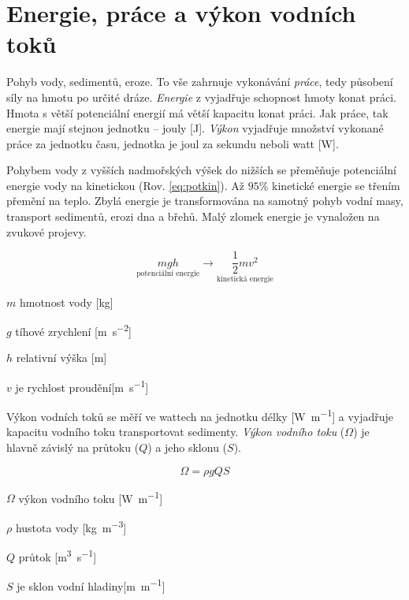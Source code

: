 \section{Energie, práce a výkon vodních toků}
Pohyb vody, sedimentů, eroze. To vše zahrnuje vykonávání \emph{práce}, tedy působení síly na hmotu po určité dráze. \emph{Energie} z vyjadřuje schopnost hmoty konat práci. Hmota s větší potenciální energií má větší kapacitu konat práci. Jak práce, tak energie mají stejnou jednotku -- jouly [\si{\joule}]. \emph{Výkon} vyjadřuje množství vykonané práce za jednotku času, jednotka je joul za sekundu neboli watt [\si{\watt}].

Pohybem vody z vyšších nadmořských výšek do nižších se přeměňuje potenciální energie vody na kinetickou (Rov. \ref{eq:potkin}). Až $95 \%$ kinetické energie se třením přemění na teplo. Zbylá energie je transformována na samotný pohyb vodní masy, transport sedimentů, erozi dna a břehů. Malý zlomek energie je vynaložen na zvukové projevy. 

\begin{equation}\label{eq:potkin}
	\underset{\text{potenciální energie}}{mgh} \longrightarrow \underset{\text{kinetická energie}}{\frac{1}{2}m v^{2}}
\end{equation}

\begin{eqexpl}
	\item{$m$} hmotnost vody [\si{\kilo\gram}]
	\item{$g$} tíhové zrychlení [\si{\metre\per\second\squared}]
	\item{$h$} relativní výška [\si{\metre}]
	\item{$v$} je rychlost proudění[\si{\metre\per\second}]
\end{eqexpl}

Výkon vodních toků se měří ve wattech na jednotku délky [\si{\watt\per\metre}] a vyjadřuje kapacitu vodního toku transportovat sedimenty. \emph{Výkon vodního toku} ($\Omega$) je hlavně závislý na průtoku ($Q$) a jeho sklonu ($S$).

\begin{equation}\label{eq:vykontoku}
	\Omega = \rho g Q S
\end{equation}

\begin{eqexpl}
	\item{$\Omega$} výkon vodního toku [\si{\watt\per\metre}]
	\item{$\rho$} hustota vody [\si{\kilogram\per\metre\cubed}]
	\item{$Q$} průtok [\si{\metre\cubed\per\second}]
	\item{$S$} je sklon vodní hladiny[\si{\metre\per\metre}]
\end{eqexpl}

